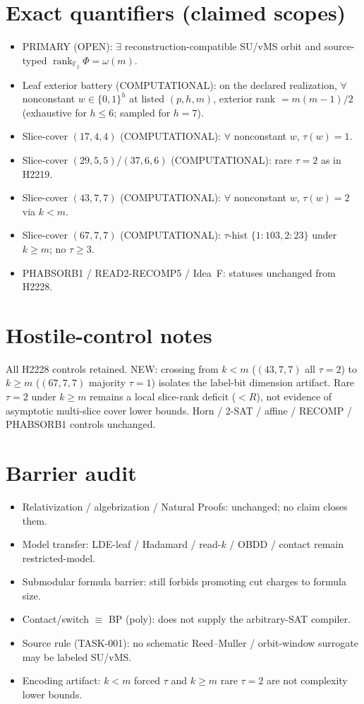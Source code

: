 \documentclass[11pt]{article}
\begin{document}
\section*{Exact quantifiers (claimed scopes)}
\begin{itemize}
\item PRIMARY (OPEN): $\exists$ reconstruction-compatible SU/vMS orbit and source-typed
  $\operatorname{rank}_{\mathbb F_2}\Phi=\omega(m)$.
\item Leaf exterior battery (COMPUTATIONAL): on the declared realization, $\forall$ nonconstant
  $w\in\{0,1\}^h$ at listed $(p,h,m)$, exterior rank $=m(m-1)/2$
  (exhaustive for $h\le6$; sampled for $h{=}7$).
\item Slice-cover $(17,4,4)$ (COMPUTATIONAL): $\forall$ nonconstant $w$, $\tau(w)=1$.
\item Slice-cover $(29,5,5)$/$(37,6,6)$ (COMPUTATIONAL): rare $\tau{=}2$ as in H2219.
\item Slice-cover $(43,7,7)$ (COMPUTATIONAL): $\forall$ nonconstant $w$, $\tau(w)=2$ via $k{<}m$.
\item Slice-cover $(67,7,7)$ (COMPUTATIONAL): $\tau$-hist $\{1{:}103,2{:}23\}$ under $k{\ge}m$;
  no $\tau{\ge}3$.
\item PHABSORB1 / READ2-RECOMP5 / Idea~F: statuses unchanged from H2228.
\end{itemize}

\section*{Hostile-control notes}
All H2228 controls retained. NEW: crossing from $k{<}m$ ($(43,7,7)$ all $\tau{=}2$) to
$k{\ge}m$ ($(67,7,7)$ majority $\tau{=}1$) isolates the label-bit dimension artifact.
Rare $\tau{=}2$ under $k{\ge}m$ remains a local slice-rank deficit ($<R$), not evidence of
asymptotic multi-slice cover lower bounds. Horn / 2-SAT / affine / RECOMP / PHABSORB1
controls unchanged.

\section*{Barrier audit}
\begin{itemize}
\item Relativization / algebrization / Natural Proofs: unchanged; no claim closes them.
\item Model transfer: LDE-leaf / Hadamard / read-$k$ / OBDD / contact remain restricted-model.
\item Submodular formula barrier: still forbids promoting cut charges to formula size.
\item Contact/switch $\equiv$ BP (poly): does not supply the arbitrary-SAT compiler.
\item Source rule (TASK-001): no schematic Reed--Muller / orbit-window surrogate may be labeled SU/vMS.
\item Encoding artifact: $k{<}m$ forced $\tau$ and $k{\ge}m$ rare $\tau{=}2$ are not complexity lower bounds.
\end{itemize}
\end{document}
